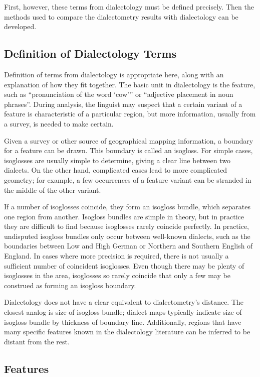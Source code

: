 First, however, these terms from dialectology must be defined
precisely. Then the methods used to compare the dialectometry results
with dialectology can be developed.

\subsection{Definition of Dialectology Terms}

Definition of terms from dialectology is appropriate here, along with
an explanation of how they fit together. The basic unit in
dialectology is the feature, such as ``pronunciation of the word
`cow''' or ``adjective placement in noun phrases''. During analysis,
the linguist may suspect that a certain variant of a feature is
characteristic of a particular region, but more information, usually
from a survey, is needed to make certain.

Given a survey or other source of geographical mapping information, a
boundary for a feature can be drawn. This boundary is called an
isogloss. For simple cases, isoglosses are usually simple to
determine, giving a clear line between two dialects. On the other
hand, complicated cases lead to more complicated geometry; for
example, a few occurrences of a feature variant
can be stranded in the middle of the other variant.

If a number of isoglosses coincide, they form an isogloss bundle,
which separates one region from another. Isogloss bundles are simple
in theory, but in practice they are difficult to find because
isoglosses rarely coincide perfectly. In practice, undisputed isogloss
bundles only occur between well-known dialects, such as the
boundaries between Low and High German or Northern and Southern
English of England. In cases where more precision is required, there
is not usually a sufficient number of coincident isoglosses. Even
though there may be plenty of isoglosses in the area, isoglosses so
rarely coincide that only a few may be construed as forming an
isogloss boundary.

Dialectology does not have a clear equivalent to dialectometry's
distance. The closest analog is size of isogloss bundle; dialect maps
typically indicate size of isogloss bundle by thickness of boundary
line. Additionally, regions that have many specific features known in the
dialectology literature can be inferred to be distant from the rest.

\subsection{Features}

